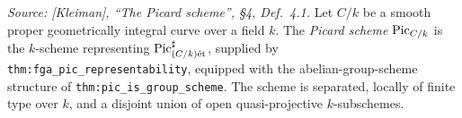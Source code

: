 \begin{definition}
  \label{def:pic_scheme}

  \textit{Source: [Kleiman], ``The Picard scheme'', \S 4, Def.~4.1.}
  Let \(C/k\) be a smooth proper geometrically integral curve over a field
  \(k\). The \emph{Picard scheme} \(\operatorname{Pic}_{C/k}\) is the \(k\)-scheme representing
  \(\operatorname{Pic}^\sharp_{(C/k)\mathrm{\acute{e}t}}\), supplied by
  \texttt{thm:fga_pic_representability}, equipped with the abelian-group-scheme
  structure of \texttt{thm:pic_is_group_scheme}. The scheme is separated,
  locally of finite type over \(k\), and a disjoint union of open
  quasi-projective \(k\)-subschemes.
\end{definition}

